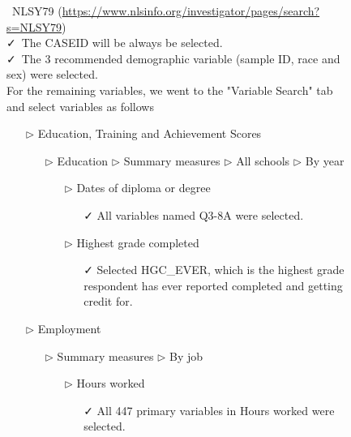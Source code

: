 \documentclass{article}
\begin{document}
\begin{figure}[t]

\begin{tcolorbox}[title = Navigating the data source]
\faDatabase\ NLSY79 (\url{https://www.nlsinfo.org/investigator/pages/search?s=NLSY79})\\
\vspace{1mm}
\faCheck\ The CASEID will be always be selected.  \\
\vspace{1mm}
\faCheck\ The 3 recommended demographic variable (sample ID, race and sex) were selected.  \\
\vspace{1mm}
For the remaining variables, we went to the "Variable Search" tab and select variables as follows
\begin{itemize}
\item[$\triangleright$] Education, Training and Achievement Scores
\begin{itemize}
\item[$\triangleright$] Education $\triangleright$ Summary measures $\triangleright$ All schools $\triangleright$ By year
\begin{itemize}
\item[$\triangleright$] Dates of diploma or degree
\begin{itemize}
\item[\faCheck] All variables named Q3-8A were selected. 
\end{itemize}
\end{itemize}
\begin{itemize}
\item[$\triangleright$] Highest grade completed
\begin{itemize}
\item[\faCheck] Selected HGC\_EVER, which is the highest grade respondent has ever reported completed and getting credit for.
\end{itemize}
\end{itemize}
\end{itemize}
\item[$\triangleright$] Employment
\begin{itemize}
\item[$\triangleright$] Summary measures $\triangleright$ By job
\begin{itemize}
\item[$\triangleright$] Hours worked  
\begin{itemize}
\item[\faCheck] All 447 primary variables in Hours worked were selected.

\end{itemize}
\end{itemize}
\end{itemize}
\end{itemize}
\end{tcolorbox}
\end{figure}
\end{document}

